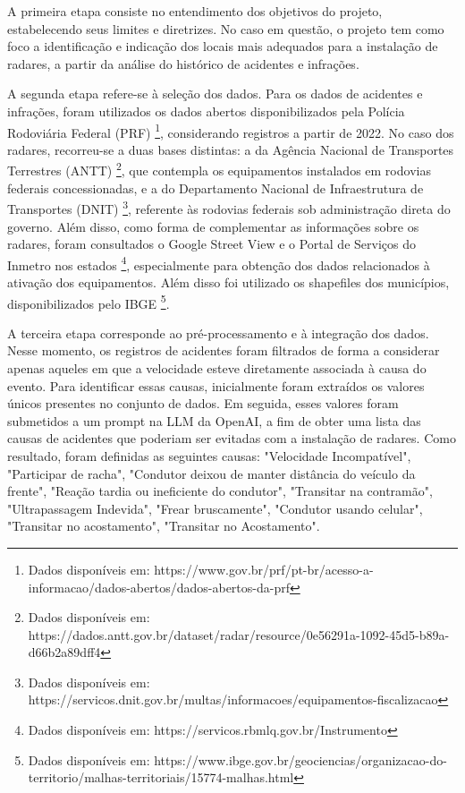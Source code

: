 \documentclass[12pt]{article}
\begin{document}
A primeira etapa consiste no entendimento dos objetivos do projeto, estabelecendo seus limites e diretrizes. No caso em questão, o projeto tem como foco a identificação e indicação dos locais mais adequados para a instalação de radares, a partir da análise do histórico de acidentes e infrações.

A segunda etapa refere-se à seleção dos dados. Para os dados de acidentes e infrações, foram utilizados os dados abertos disponibilizados pela Polícia Rodoviária Federal (PRF) \footnote{Dados disponíveis em: https://www.gov.br/prf/pt-br/acesso-a-informacao/dados-abertos/dados-abertos-da-prf}, considerando registros a partir de 2022. No caso dos radares, recorreu-se a duas bases distintas: a da Agência Nacional de Transportes Terrestres (ANTT) \footnote{Dados disponíveis em: https://dados.antt.gov.br/dataset/radar/resource/0e56291a-1092-45d5-b89a-d66b2a89dff4}, que contempla os equipamentos instalados em rodovias federais concessionadas, e a do Departamento Nacional de Infraestrutura de Transportes (DNIT) \footnote{Dados disponíveis em: https://servicos.dnit.gov.br/multas/informacoes/equipamentos-fiscalizacao}, referente às rodovias federais sob administração direta do governo. Além disso, como forma de complementar as informações sobre os radares, foram consultados o Google Street View e o Portal de Serviços do Inmetro nos estados \footnote{Dados disponíveis em: https://servicos.rbmlq.gov.br/Instrumento}, especialmente para obtenção dos dados relacionados à ativação dos equipamentos. Além disso foi utilizado os shapefiles dos municípios, disponibilizados pelo IBGE \footnote{Dados disponíveis em: https://www.ibge.gov.br/geociencias/organizacao-do-territorio/malhas-territoriais/15774-malhas.html}.

A terceira etapa corresponde ao pré-processamento e à integração dos dados. Nesse momento, os registros de acidentes foram filtrados de forma a considerar apenas aqueles em que a velocidade esteve diretamente associada à causa do evento. Para identificar essas causas, inicialmente foram extraídos os valores únicos presentes no conjunto de dados. Em seguida, esses valores foram submetidos a um prompt na LLM da OpenAI, a fim de obter uma lista das causas de acidentes que poderiam ser evitadas com a instalação de radares. Como resultado, foram definidas as seguintes causas: "Velocidade Incompatível", "Participar de racha", "Condutor deixou de manter distância do veículo da frente", "Reação tardia ou ineficiente do condutor", "Transitar na contramão", "Ultrapassagem Indevida", "Frear bruscamente", "Condutor usando celular", "Transitar no acostamento", "Transitar no Acostamento".
\end{document}
